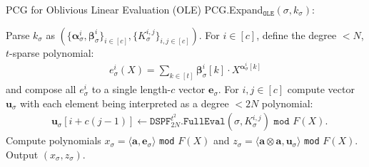 \begin{specialconstruction}{PCG for Oblivious Linear Evaluation (OLE)}
PCG.Expand$_{\texttt{OLE}}(\sigma, k_\sigma)$:
\begin{algorithmic}[1]
\State Parse $k_\sigma $ as $(\{\boldsymbol{\alpha}_\sigma^i, \boldsymbol{\beta}_\sigma^i\}_{i\in[c]}, \{K_\sigma^{i,j}\}_{i,j\in[c]})$.
\State For $i \in [c]$, define the degree $< N$, $t$-sparse polynomial:
\begin{align*}
e^i_\sigma(X) = \sum_{k\in [t]} \boldsymbol{\beta}_\sigma^i[k] \cdot X^{\boldsymbol{\alpha}_\sigma^i[k]}
\end{align*}
and compose all $e^i_\sigma$ to a single length-$c$ vector $\boldsymbol{e}_\sigma$.
\State For $i, j \in [c]$ compute vector $\boldsymbol{u}_\sigma$ with each element being interpreted as a degree $< 2N$ polynomial:
\begin{align*}
& \boldsymbol{u}_\sigma[i+c(j-1)] \leftarrow \texttt{DSPF}^{t^2}_{2N}\texttt{.FullEval}(\sigma, K_\sigma^{i,j}) \texttt{ mod } F(X).
\end{align*}
\State Compute polynomials $x_\sigma = \langle\boldsymbol{a},\boldsymbol{e}_\sigma\rangle$ \texttt{mod} $F(X)$ and $z_\sigma = \langle\boldsymbol{a}\otimes\boldsymbol{a},\boldsymbol{u}_\sigma\rangle$ \texttt{mod} $F(X)$.
\State Output $(x_\sigma, z_\sigma)$.
\label{c:OLEBoyle}
\end{algorithmic}
\end{specialconstruction}

\vspace{1em}

